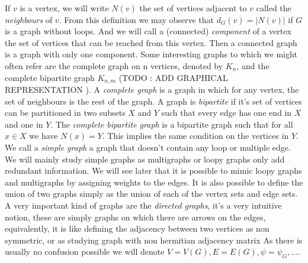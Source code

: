 If $v$ is a vertex, we will write $N(v)$ the set of vertices adjacent to $v$ called the \emph{neighbours} of $v$.
From this definition we may observe that $d_G(v) = |N(v)|$ if $G$ is a graph without loops. 
And we will call a (connected) \emph{component} of a vertex the set of vertices that can be reached from this vertex. 
Then a connected graph is a graph with only one component.
\newline
Some interesting graphs to which we might often refer are the complete graph on n vertices, denoted by $K_n$, and the complete bipartite graph $K_{n,m}$ (TODO : ADD GRAPHICAL REPRESENTATION ). 
A \emph{complete graph} is a graph in which for any vertex, the set of neighbours is the rest of the graph. 
A graph is \emph{bipartite} if it's set of vertices can be partitioned in two subsets $X$ and $Y$ such that every edge has one end in $X$ and one in $Y$. 
The \emph{complete bipartite graph} is a bipartite graph such that for all $x \in X$ we have $N(x) = Y$. 
This implies the same condition on the vertices in $Y$.
\newline
We call a \emph{simple graph} a graph that doesn't contain any loop or multiple edge. We will mainly study simple graphs as multigraphs or loopy graphs only add redundant information. 
We will see later that it is possible to mimic loopy graphs and multigraphs by assigning weights to the edges.
\newline
It is also possible to define the union of two graphs simply as the union of each of the vertex sets and edge sets.
\newline
A very important kind of graphs are the \emph{directed graphs}, it's a very intuitive notion, these are simply graphs on which there are arrows on the edges, equivalently, it is like defining the adjacency between two vertices as non  symmetric, or as studying graph with non hermitian adjacency matrix 
\newline
As there is usually no confusion possible we will denote $V = V(G), E =E(G), \psi = \psi_G, ...$. 


